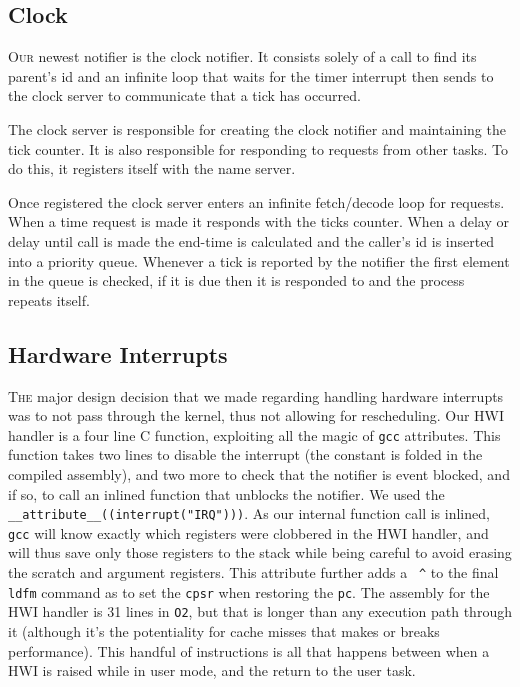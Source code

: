 \documentclass{amsart}
\begin{document}
\subsection*{Clock}

\textsc{Our} newest notifier is the clock notifier. It consists solely of a call to find
its parent's id and an infinite loop that waits for the timer interrupt then
sends to the clock server to communicate that a tick has occurred.

The clock server is responsible for creating the clock notifier and maintaining
the tick counter. It is also responsible for responding to requests from other
tasks. To do this, it registers itself with the name server.

Once registered the clock server enters an infinite fetch/decode loop for
requests. When a time request is made it responds with the ticks counter. When a
delay or delay until call is made the end-time is calculated and the caller's id
is inserted into a priority queue. Whenever a tick is reported by the notifier
the first element in the queue is checked, if it is due then it is responded to
and the process repeats itself.

\subsection*{Hardware Interrupts}

\textsc{The} major design decision that we made regarding handling hardware
interrupts was to not pass through the kernel, thus not allowing for
rescheduling. Our HWI handler is a four line C function, exploiting all the
magic of \texttt{gcc} attributes. This function takes two lines to disable the
interrupt (the constant is folded in the compiled assembly), and two more to
check that the notifier is event blocked, and if so, to call an inlined function
that unblocks the notifier. We used the
\texttt{\_\_attribute\_\_((interrupt("IRQ")))}. As our internal function call is
inlined, \texttt{gcc} will know exactly which registers were clobbered in the
HWI handler, and will thus save only those registers to the stack while being
careful to avoid erasing the scratch and argument registers. This attribute
further adds a~ \texttt{\^} to the final \texttt{ldfm} command as to set the
\texttt{cpsr} when restoring the \texttt{pc}. The assembly for the HWI handler
is 31 lines in \texttt{O2}, but that is longer than any execution path through
it (although it's the potentiality for cache misses that makes or breaks
performance). This handful of instructions is all that happens between when a
HWI is raised while in user mode, and the return to the user task.
\end{document}
